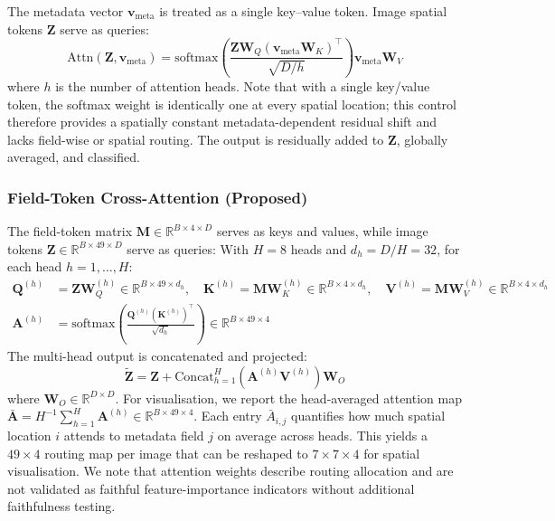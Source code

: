 \documentclass[12pt, a4paper]{article}
\newcommand{\R}{\mathbb{R}}
\begin{document}
The metadata vector $\mathbf{v}_{\text{meta}}$ is treated as a single key--value token. Image spatial tokens $\mathbf{Z}$ serve as queries:
\begin{equation}
    \text{Attn}(\mathbf{Z}, \mathbf{v}_{\text{meta}}) = \text{softmax}\!\left(\frac{\mathbf{Z}\mathbf{W}_Q (\mathbf{v}_{\text{meta}}\mathbf{W}_K)^\top}{\sqrt{D/h}}\right) \mathbf{v}_{\text{meta}}\mathbf{W}_V
\end{equation}
where $h$ is the number of attention heads. Note that with a single key/value token, the softmax weight is identically one at every spatial location; this control therefore provides a spatially constant metadata-dependent residual shift and lacks field-wise or spatial routing. The output is residually added to $\mathbf{Z}$, globally averaged, and classified.

\subsubsection{Field-Token Cross-Attention (Proposed)}

The field-token matrix $\mathbf{M} \in \R^{B \times 4 \times D}$ serves as keys and values, while image tokens $\mathbf{Z} \in \R^{B \times 49 \times D}$ serve as queries:
With $H=8$ heads and $d_h = D/H = 32$, for each head $h = 1, \ldots, H$:
\begin{align}
    \mathbf{Q}^{(h)} &= \mathbf{Z}\mathbf{W}_Q^{(h)} \in \R^{B \times 49 \times d_h}, \quad
    \mathbf{K}^{(h)} = \mathbf{M}\mathbf{W}_K^{(h)} \in \R^{B \times 4 \times d_h}, \quad
    \mathbf{V}^{(h)} = \mathbf{M}\mathbf{W}_V^{(h)} \in \R^{B \times 4 \times d_h} \\
    \mathbf{A}^{(h)} &= \text{softmax}\!\left(\frac{\mathbf{Q}^{(h)}(\mathbf{K}^{(h)})^\top}{\sqrt{d_h}}\right) \in \R^{B \times 49 \times 4}
    \label{eq:attention_weights}
\end{align}
The multi-head output is concatenated and projected:
\begin{equation}
    \tilde{\mathbf{Z}} = \mathbf{Z} + \text{Concat}_{h=1}^{H}\!\left(\mathbf{A}^{(h)} \mathbf{V}^{(h)}\right) \mathbf{W}_O
    \label{eq:field_token_output}
\end{equation}
where $\mathbf{W}_O \in \R^{D \times D}$. For visualisation, we report the head-averaged attention map $\bar{\mathbf{A}} = H^{-1}\sum_{h=1}^{H} \mathbf{A}^{(h)} \in \R^{B \times 49 \times 4}$. Each entry $\bar{A}_{i,j}$ quantifies how much spatial location $i$ attends to metadata field $j$ on average across heads. This yields a $49 \times 4$ routing map per image that can be reshaped to $7 \times 7 \times 4$ for spatial visualisation. We note that attention weights describe routing allocation and are not validated as faithful feature-importance indicators without additional faithfulness testing.
\end{document}
